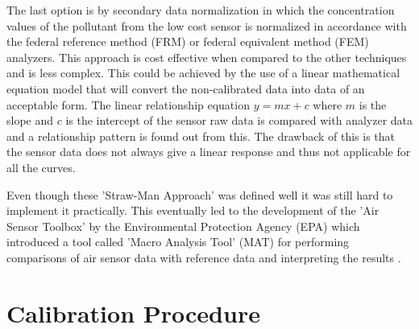 \documentclass[12pt,a4paper,oneside]{report}
\begin{document}
The last option is by secondary data normalization in which the concentration values of the pollutant from the low cost sensor is normalized in accordance with the federal reference method (FRM) or federal equivalent method (FEM) analyzers. This approach is cost effective when compared to the other techniques and is less complex. This could be achieved by the use of a linear mathematical equation model that will convert the non-calibrated data into data of an acceptable form. The linear relationship equation $ y = mx + c $ where $ m $ is the slope and $ c $ is the intercept of the sensor raw data is compared with analyzer data and a relationship pattern is found out from this. The drawback of this is that the sensor data does not always give a linear response and thus not applicable for all the curves. 

Even though these 'Straw-Man Approach' was defined well it was still hard to implement it practically. This eventually led to the development of the 'Air Sensor Toolbox' by the Environmental Protection Agency (EPA) \cite{Williams2014} which introduced a tool called 'Macro Analysis Tool' (MAT) for performing comparisons of air sensor data with reference data and interpreting the results \cite{airsensorguidebook}.

\section*{Calibration Procedure}
\end{document}
